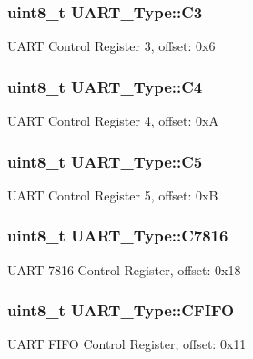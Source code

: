 \subsubsection[{\texorpdfstring{C3}{C3}}]{ uint8\+\_\+t U\+A\+R\+T\+\_\+\+Type\+::\+C3}\hypertarget{structUART__Type_a23270f53f190afb3fe05203af6bc0059}{}\label{structUART__Type_a23270f53f190afb3fe05203af6bc0059}
U\+A\+RT Control Register 3, offset\+: 0x6 
\subsubsection[{\texorpdfstring{C4}{C4}}]{ uint8\+\_\+t U\+A\+R\+T\+\_\+\+Type\+::\+C4}\hypertarget{structUART__Type_aaefdf66d5b1fa972353e74c01dbbfa95}{}\label{structUART__Type_aaefdf66d5b1fa972353e74c01dbbfa95}
U\+A\+RT Control Register 4, offset\+: 0xA 
\subsubsection[{\texorpdfstring{C5}{C5}}]{ uint8\+\_\+t U\+A\+R\+T\+\_\+\+Type\+::\+C5}\hypertarget{structUART__Type_ad807dc965307ce5a463d79158802b3a3}{}\label{structUART__Type_ad807dc965307ce5a463d79158802b3a3}
U\+A\+RT Control Register 5, offset\+: 0xB 
\subsubsection[{\texorpdfstring{C7816}{C7816}}]{ uint8\+\_\+t U\+A\+R\+T\+\_\+\+Type\+::\+C7816}\hypertarget{structUART__Type_a289733e31a513073ee9a94532afc2b72}{}\label{structUART__Type_a289733e31a513073ee9a94532afc2b72}
U\+A\+RT 7816 Control Register, offset\+: 0x18 
\subsubsection[{\texorpdfstring{C\+F\+I\+FO}{CFIFO}}]{ uint8\+\_\+t U\+A\+R\+T\+\_\+\+Type\+::\+C\+F\+I\+FO}\hypertarget{structUART__Type_a1789480a2f51e46911338c5837a6fc68}{}\label{structUART__Type_a1789480a2f51e46911338c5837a6fc68}
U\+A\+RT F\+I\+FO Control Register, offset\+: 0x11 
